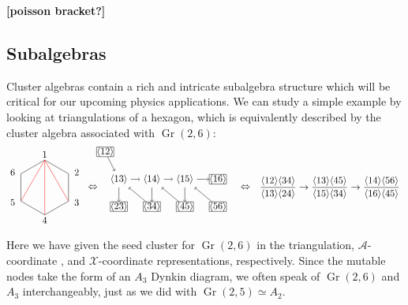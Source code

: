 \documentclass[11pt]{article}
\DeclareMathOperator{\Gr}{Gr}
\def\ket#1{\langle #1 \rangle}
\def\xcoord{$\mathcal{X}$-coordinate }
\def\acoord{$\mathcal{A}$-coordinate }
\def\draftnote#1{{\bf [#1]}}
\def\drawLabeledHexagon{
\coordinate (P1) at (90:1);
\coordinate (P2) at (30:1);
\coordinate (P3) at (330:1);
\coordinate (P4) at (270:1);
\coordinate (P5) at (210:1);
\coordinate (P6) at (150:1);
\draw (P1) -- (P2) -- (P3) -- (P4) -- (P5) -- (P6) -- cycle;
\draw (0,1.2) node {1};
\draw (30:1.1) node[anchor=west] {2};
\draw (330:1.1) node[anchor=west] {3};
\draw (270:1.2) node {4};
\draw (210:1.1) node[anchor=east] {5};
\draw (150:1.1) node[anchor=east] {6};
}
\begin{document}
\draftnote{poisson bracket?}

\subsection{Subalgebras}

Cluster algebras contain a rich and intricate subalgebra structure which will be critical for our upcoming physics applications. We can study a simple example by looking at triangulations of a hexagon, which is equivalently described by the cluster algebra associated with $\Gr(2,6)$:
\begin{equation}\label{eq:gr26-seed}
\begin{gathered}
\begin{tikzpicture}
	\drawLabeledHexagon
  	\draw[color=red] (P1) -- (P3);
  	\draw[color=red] (P1) -- (P4);
  	\draw[color=red] (P1) -- (P5);
	\draw (1.75,0) node {$\Leftrightarrow$};
	\begin{scope}[xshift = .2cm, yshift = .3cm]
	\def \xSep {1.2}
	\def \xInit {2.5}
    \node (13) at (\xInit,0) {$\ket{13}$};
    \node (14) at (\xInit+\xSep,0) {$\ket{14}$};
    \node (15) at (\xInit+2*\xSep,0) {$\ket{15}$};
	\node[draw, inner sep=0mm] (12) at (2,1) {$\ket{12}$};
    \node[draw, inner sep=0mm] (16) at (\xInit+3*\xSep,0) {$\ket{16}$};
    \node[draw, inner sep=0mm] (56) at (\xInit+3*\xSep,-1) {$\ket{56}$};
    \node[draw, inner sep=0mm] (45) at (\xInit+2*\xSep,-1) {$\ket{45}$};
    \node[draw, inner sep=0mm] (34) at (\xInit+\xSep,-1) {$\ket{34}$};
    \node[draw, inner sep=0mm] (23) at (\xInit,-1) {$\ket{23}$};
    \draw[->] (12) -- (13);
    \draw[->] (13) -- (14);
    \draw[->] (14) -- (15);
    \draw[->] (15) -- (16);
    \draw[->] (13) -- (23);
    \draw[->] (34) -- (13);
    \draw[->] (14) -- (34);
    \draw[->] (45) -- (14);
    \draw[->] (15) -- (45);
    \draw[->] (56) -- (15);
    \end{scope}
    \draw (7.3,0) node {$\Leftrightarrow$};
    \node[anchor=west] at (7.7,0) {$\displaystyle \frac{\ket{12}\ket{34}}{\ket{13}\ket{24}}\to\frac{\ket{13}\ket{45}}{\ket{15}\ket{34}}\to\frac{\ket{14}\ket{56}}{\ket{16}\ket{45}} $};
\end{tikzpicture} 
\end{gathered}
\end{equation}
Here we have given the seed cluster for $\Gr(2,6)$ in the triangulation, \acoord, and \xcoord representations, respectively. Since the mutable nodes take the form of an $A_3$ Dynkin diagram, we often speak of $\Gr(2,6)$ and $A_3$ interchangeably, just as we did with $\Gr(2,5) \simeq A_2$. 
\end{document}
